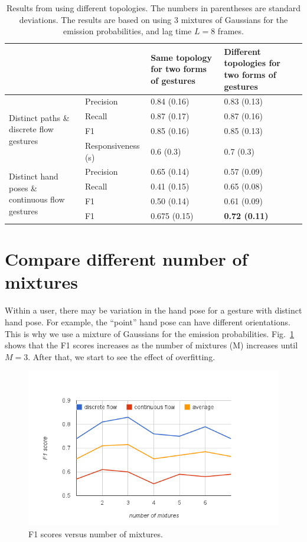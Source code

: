 \begin{table}[t]
\caption{Results from using different topologies. The numbers in parentheses are
standard deviations. The results are based on using 3 mixtures of Gaussians
for the emission probabilities, and lag time $L = 8$ frames.}
\label{tab:result}
\centering
\begin{tabular}{|l|l|p{3cm}|p{3cm}|}
\hline
& & Same topology for two forms of gestures & Different topologies for two forms
of gestures \\
\hline
\multirow{4}{4cm}{Distinct paths \& discrete flow gestures} 
& Precision & 0.84 (0.16) & 0.83 (0.13) \\
\cline{2-4}
& Recall & 0.87 (0.17) & 0.87 (0.16)\\
\cline{2-4}
& F1 & 0.85 (0.16) &  0.85 (0.13)\\
\cline{2-4}
& Responsiveness (s) & 0.6 (0.3) & 0.7 (0.3) \\
\hline
\multirow{4}{4.5cm}{Distinct hand poses \& continuous flow gestures}
& Precision & 0.65 (0.14) & 0.57 (0.09) \\
\cline{2-4}
& Recall & 0.41 (0.15) & 0.65 (0.08) \\
\cline{2-4}
& F1 & 0.50 (0.14) & 0.61 (0.09) \\
\hline
\textbf{Average} & F1 & 0.675 (0.15) & \textbf{0.72 (0.11)} \\
\hline
\end{tabular}
\end{table}

\section{Compare different number of mixtures}
Within a user, there may be variation in the hand pose for a
gesture with distinct hand pose. For example, the ``point'' hand pose can have
different orientations. This is why we use a mixture of Gaussians for the
emission probabilities. Fig.~\ref{fig:mixtures}
shows that the F1 scores increases as the number of mixtures (M) increases until $M=3$.
After that, we start to see the effect of overfitting.

\begin{figure}[t]
\centering
\includegraphics[trim=10mm 5mm 10mm 15mm,
clip, width=\columnwidth]{figures/f1_nM.png}
\caption{F1 scores versus number of mixtures.}
\label{fig:mixtures}
\end{figure}


